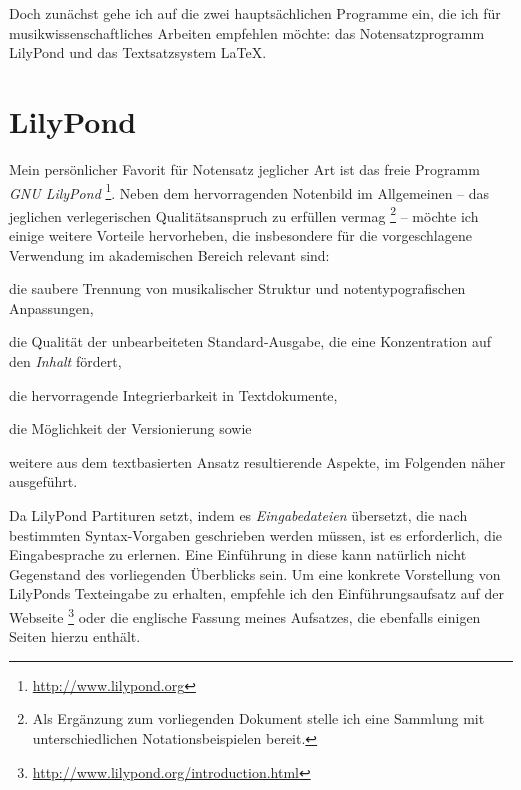 \documentclass[DIV=12]{scrreprt}
\begin{document}
Doch zunächst gehe ich auf die zwei hauptsächlichen Programme ein, die ich für musikwissenschaftliches Arbeiten empfehlen möchte:
das Notensatzprogramm LilyPond und
das Textsatzsystem \LaTeX.

\chapter{LilyPond}
\label{chap:pt_lilypond}
Mein persönlicher Favorit für Notensatz jeglicher Art ist das freie Programm \emph{GNU LilyPond}%
\footnote{\url{http://www.lilypond.org}}.
Neben dem hervorragenden Notenbild im Allgemeinen -- das jeglichen verlegerischen Qualitätsanspruch zu erfüllen vermag%
\footnote{Als Ergänzung zum vorliegenden Dokument stelle ich eine Sammlung mit unterschiedlichen Notationsbeispielen bereit.}
-- möchte ich einige weitere Vorteile hervorheben, die insbesondere für die vorgeschlagene Verwendung im akademischen Bereich relevant sind:

\begin{itemize*}
\item die saubere Trennung von musikalischer Struktur und notentypografischen Anpassungen,
\item die Qualität der unbearbeiteten Standard-Ausgabe, die eine Konzentration auf den \emph{Inhalt} fördert,
\item die hervorragende Integrierbarkeit in Textdokumente,
\item die Möglichkeit der Versionierung sowie
\item weitere aus dem textbasierten Ansatz resultierende Aspekte, im Folgenden näher ausgeführt.
\end{itemize*}

Da LilyPond Partituren setzt, indem es \emph{Eingabedateien} übersetzt, die nach bestimmten Syntax-Vorgaben geschrieben werden müssen, ist es erforderlich, die Eingabesprache zu erlernen.
Eine Einführung in diese kann natürlich nicht Gegenstand des vorliegenden Überblicks sein.
Um eine konkrete Vorstellung von LilyPonds Texteingabe zu erhalten, empfehle ich den Einführungsaufsatz auf der Webseite%
\footnote{\url{http://www.lilypond.org/introduction.html}}
oder die englische Fassung meines Aufsatzes, die ebenfalls einigen Seiten hierzu enthält.
\end{document}
